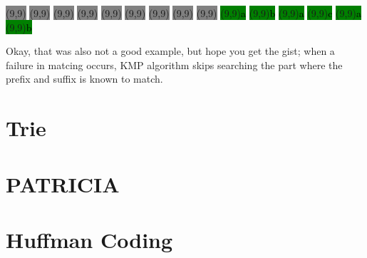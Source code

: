 \begin{center}
  \colorbox{gray}{\makebox(9,9){\textcolor{black}{}}}
  \colorbox{gray}{\makebox(9,9){\textcolor{black}{}}}
  \colorbox{gray}{\makebox(9,9){\textcolor{black}{}}}
  \colorbox{gray}{\makebox(9,9){\textcolor{black}{}}}
  \colorbox{gray}{\makebox(9,9){\textcolor{black}{}}}
  \colorbox{gray}{\makebox(9,9){\textcolor{black}{}}}
  \colorbox{gray}{\makebox(9,9){\textcolor{black}{}}}
  \colorbox{gray}{\makebox(9,9){\textcolor{black}{}}}
  \colorbox{gray}{\makebox(9,9){\textcolor{black}{}}}
  \colorbox{green}{\makebox(9,9){\textcolor{black}{a}}}
  \colorbox{green}{\makebox(9,9){\textcolor{black}{b}}}
  \colorbox{green}{\makebox(9,9){\textcolor{black}{a}}}
  \colorbox{green}{\makebox(9,9){\textcolor{black}{c}}}
  \colorbox{green}{\makebox(9,9){\textcolor{black}{a}}}
  \colorbox{green}{\makebox(9,9){\textcolor{black}{b}}}
\end{center}

\noindent Okay, that was also not a good example, but hope you get the gist; when a failure in matcing occurs, KMP algorithm skips searching the part where the prefix and suffix is known to match.

\section{Trie}

\section{PATRICIA}

\section{Huffman Coding}
